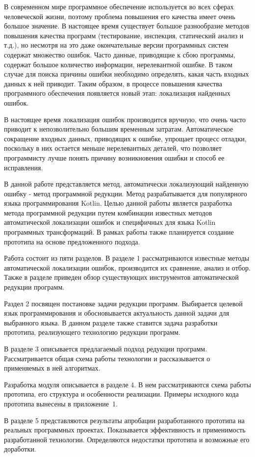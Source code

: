 \intro
В современном мире программное обеспечение используется во всех сферах человеческой жизни, поэтому проблема повышения его качества имеет очень большое значение. В настоящее время существует большое разнообразие методов повышения качества программ (тестирование, инспекция, статический анализ и т.д.), но несмотря на это даже окончательные версии программных систем содержат множество ошибок. Часто данные, приводящие к сбою программы, содержат большое количество информации, нерелевантной ошибке. В таком случае для поиска причины ошибки необходимо определять, какая часть входных данных к ней приводит. Таким образом, в процессе повышения качества программного обеспечения появляется новый этап: локализация найденных ошибок. 

В настоящее время локализация ошибок производится вручную, что очень часто приводит к непозволительно большим временным затратам. Автоматическое сокращение входных данных, приводящих к ошибке, упрощает процесс отладки, поскольку в них остается меньше нерелевантных деталей, что позволяет программисту лучше понять причину возникновения ошибки и способ ее исправления.

В данной работе представляется метод, автоматически локализующий найденную ошибку - метод программной редукции. Метод разрабатывается для популярного~\cite{tiobe2018tiobe} языка программирования Kotlin. Целью данной работы является разработка метода программной редукции путем комбинации известных методов автоматической локализации ошибок и специфичных для языка Kotlin программных трансформаций. В рамках работы также планируется создание прототипа на основе предложенного подхода.

Работа состоит из пяти разделов. В разделе 1 рассматриваются известные методы автоматической локализации ошибок, производится их сравнение, анализ и отбор. Также в разделе приведен обзор существующих инструментов автоматической редукции программ.

Раздел 2 посвящен постановке задачи редукции программ. Выбирается целевой язык программирования и обосновывается актуальность данной задачи для выбранного языка. В данном разделе также ставится задача разработки прототипа, реализующего технологию редукции программ.

В разделе 3 описывается предлагаемый подход редукции программ. Рассматривается общая схема работы технологии и рассказывается о применяемых в ней алгоритмах.

Разработка модуля описывается в разделе 4. В нем рассматри­ваются схема работы прототипа, его структура и особенности реализации. Примеры исходного кода прототипа вынесены в приложение~1.

В разделе 5 представляются результаты апробации разработан­ного прототипа на реальных программных проектах. Показывается эффективность и применимость разработанной технологии. Определяются недостатки прототипа и возможные его доработки. 